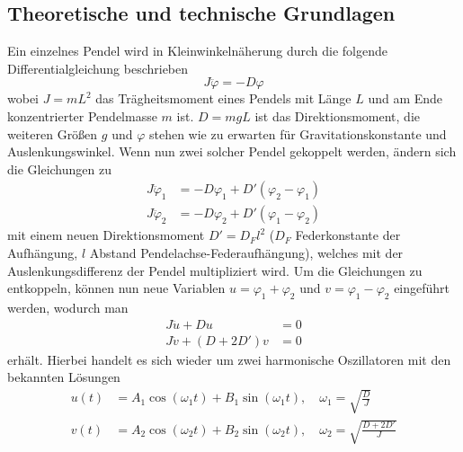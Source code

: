 \newpage

\subsection[Theoretische und technische Grundlagen]{Theoretische und technische Grundlagen \protect\autocite{Skript_2.1}}
Ein einzelnes Pendel wird in Kleinwinkelnäherung durch die folgende Differentialgleichung beschrieben
\begin{equation}
J\ddot{\varphi} = -D\varphi
\end{equation}
wobei \(J = mL^2\) das Trägheitsmoment eines Pendels mit Länge \(L\) und am Ende konzentrierter Pendelmasse \(m\) ist. \(D = mgL\) ist das Direktionsmoment, die weiteren Größen \(g\) und \(\varphi\) stehen wie zu erwarten für Gravitationskonstante und Auslenkungswinkel. Wenn nun zwei solcher Pendel gekoppelt werden, ändern sich die Gleichungen zu
\begin{subequations}
    \begin{align}
J\ddot{\varphi}_1 &= -D\varphi_1 + D'(\varphi_2 - \varphi_1)\\
J\ddot{\varphi}_2 &= -D\varphi_2 + D'(\varphi_1 - \varphi_2)
    \end{align}
\end{subequations}
mit einem neuen Direktionsmoment \(D' = D_F l^2\) (\(D_F\) Federkonstante der Aufhängung, \(l\) Abstand Pendelachse-Federaufhängung), welches mit der Auslenkungsdifferenz der Pendel multipliziert wird. Um die Gleichungen zu entkoppeln, können nun neue Variablen \(u = \varphi_1 + \varphi_2\) und \(v = \varphi_1 - \varphi_2\) eingeführt werden, wodurch man
\begin{subequations}
    \begin{align}
J\ddot{u} + Du &= 0\\
J\ddot{v} + (D + 2D')v &= 0
    \end{align}
\end{subequations}
erhält. Hierbei handelt es sich wieder um zwei harmonische Oszillatoren mit den bekannten Lösungen
\begin{subequations}
\begin{align}
u(t) &= A_1 \cos(\omega_1 t) + B_1 \sin(\omega_1 t), 
\quad \omega_1 = \sqrt{\frac{D}{J}}\label{eq:omega1}
\\
v(t) &= A_2 \cos(\omega_2 t) + B_2 \sin(\omega_2 t), 
\quad \omega_2 = \sqrt{\frac{D + 2D'}{J}}\label{eq:omega2}
\end{align}
\end{subequations}
